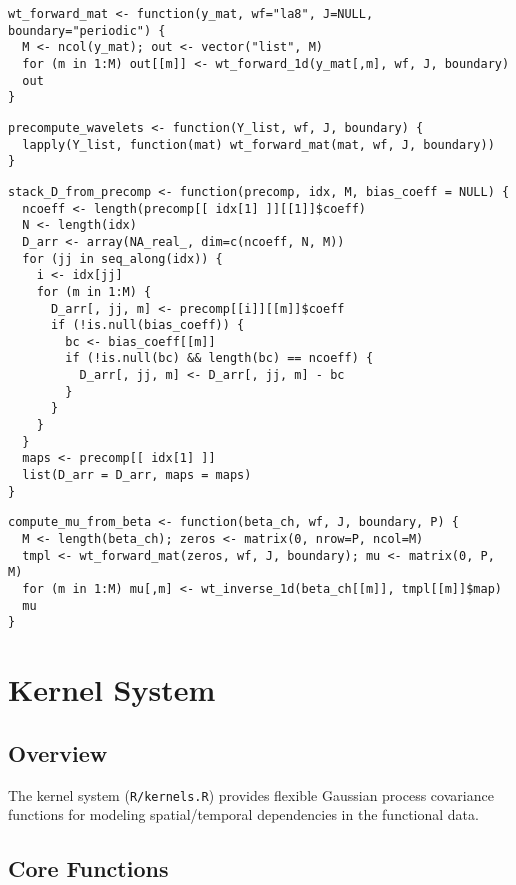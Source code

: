 \documentclass[11pt]{article}
\begin{document}
\begin{lstlisting}
wt_forward_mat <- function(y_mat, wf="la8", J=NULL, boundary="periodic") {
  M <- ncol(y_mat); out <- vector("list", M)
  for (m in 1:M) out[[m]] <- wt_forward_1d(y_mat[,m], wf, J, boundary)
  out
}
\end{lstlisting}

\begin{lstlisting}
precompute_wavelets <- function(Y_list, wf, J, boundary) {
  lapply(Y_list, function(mat) wt_forward_mat(mat, wf, J, boundary))
}
\end{lstlisting}

\begin{lstlisting}
stack_D_from_precomp <- function(precomp, idx, M, bias_coeff = NULL) {
  ncoeff <- length(precomp[[ idx[1] ]][[1]]$coeff)
  N <- length(idx)
  D_arr <- array(NA_real_, dim=c(ncoeff, N, M))
  for (jj in seq_along(idx)) {
    i <- idx[jj]
    for (m in 1:M) {
      D_arr[, jj, m] <- precomp[[i]][[m]]$coeff
      if (!is.null(bias_coeff)) {
        bc <- bias_coeff[[m]]
        if (!is.null(bc) && length(bc) == ncoeff) {
          D_arr[, jj, m] <- D_arr[, jj, m] - bc
        }
      }
    }
  }
  maps <- precomp[[ idx[1] ]]
  list(D_arr = D_arr, maps = maps)
}
\end{lstlisting}

\begin{lstlisting}
compute_mu_from_beta <- function(beta_ch, wf, J, boundary, P) {
  M <- length(beta_ch); zeros <- matrix(0, nrow=P, ncol=M)
  tmpl <- wt_forward_mat(zeros, wf, J, boundary); mu <- matrix(0, P, M)
  for (m in 1:M) mu[,m] <- wt_inverse_1d(beta_ch[[m]], tmpl[[m]]$map)
  mu
}
\end{lstlisting}


\section{Kernel System}

\subsection{Overview}

The kernel system (\texttt{R/kernels.R}) provides flexible Gaussian process covariance functions for modeling spatial/temporal dependencies in the functional data.

\subsection{Core Functions}
\end{document}
